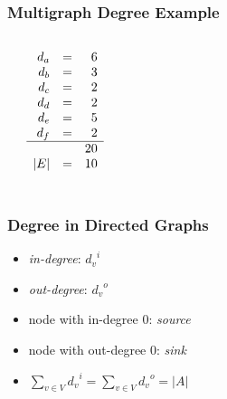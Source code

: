 \documentclass[dvipsnames]{beamer}
\begin{document}
\begin{frame}
  \frametitle{Multigraph Degree Example}

  \begin{columns}
    \begin{center}
    \end{center}

    $\begin{array}{rcr}
    d_a & = & 6\\
    d_b & = & 3\\
    d_c & = & 2\\
    d_d & = & 2\\
    d_e & = & 5\\
    d_f & = & 2\\\hline
        &   & 20\\
    \medskip
    |E| & = & 10
    \end{array}$
  \end{columns}
\end{frame}

\begin{frame}
  \frametitle{Degree in Directed Graphs}

  \begin{itemize}
    \item \emph{in-degree}: ${d_v}^i$
    \item \emph{out-degree}: ${d_v}^o$

    \pause
    \medskip
    \item node with in-degree 0: \emph{source}
    \item node with out-degree  0: \emph{sink}

    \pause
    \bigskip
    \item $\sum_{v \in V} {d_v}^i = \sum_{v \in V} {d_v}^o = |A|$
  \end{itemize}
\end{frame}
\end{document}
